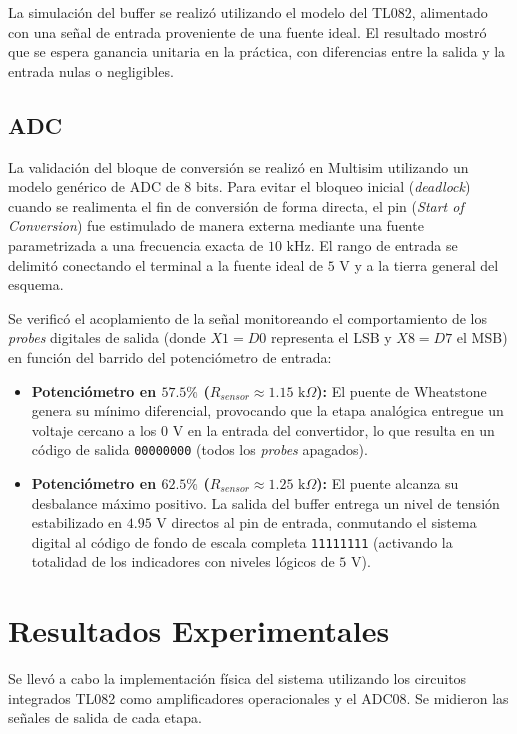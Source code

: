 \documentclass[journal, onecolumn]{IEEEtran}
\begin{document}
La simulación del buffer se realizó utilizando el modelo del TL082, alimentado con una señal de entrada proveniente de una fuente ideal. El resultado mostró que se espera ganancia unitaria en la práctica, con diferencias entre la salida y la entrada nulas o negligibles.

\subsection{ADC}

La validación del bloque de conversión se realizó en Multisim utilizando un modelo genérico de ADC de 8 bits. Para evitar el bloqueo inicial (\textit{deadlock}) cuando se realimenta el fin de conversión de forma directa, el pin  (\textit{Start of Conversion}) fue estimulado de manera externa mediante una fuente  parametrizada a una frecuencia exacta de $10\text{ kHz}$. El rango de entrada se delimitó conectando el terminal  a la fuente ideal de $5\text{ V}$ y  a la tierra general del esquema.

Se verificó el acoplamiento de la señal monitoreando el comportamiento de los \textit{probes} digitales de salida (donde $X1 = D0$ representa el LSB y $X8 = D7$ el MSB) en función del barrido del potenciómetro de entrada:
\begin{itemize}
    \item \textbf{Potenciómetro en $57.5\%$ ($R_{sensor} \approx 1.15\text{ k}\Omega$):} El puente de Wheatstone genera su mínimo diferencial, provocando que la etapa analógica entregue un voltaje cercano a los $0\text{ V}$ en la entrada del convertidor, lo que resulta en un código de salida \texttt{00000000} (todos los \textit{probes} apagados).
    
    \item \textbf{Potenciómetro en $62.5\%$ ($R_{sensor} \approx 1.25\text{ k}\Omega$):} El puente alcanza su desbalance máximo positivo. La salida del buffer entrega un nivel de tensión estabilizado en $4.95\text{ V}$ directos al pin de entrada, conmutando el sistema digital al código de fondo de escala completa \texttt{11111111} (activando la totalidad de los indicadores con niveles lógicos de $5\text{ V}$).
\end{itemize}
\section{Resultados Experimentales}
Se llevó a cabo la implementación física del sistema utilizando los circuitos integrados TL082 como amplificadores operacionales y el ADC08.
Se midieron las señales de salida de cada etapa.
\end{document}
